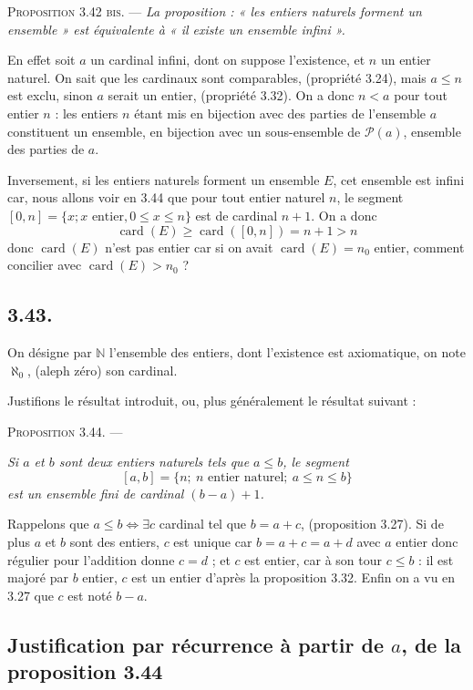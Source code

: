 \medskip\noindent\textsc{Proposition 3.42 bis.} --- \emph{La proposition : « les entiers naturels forment un ensemble » est équivalente à « il existe un ensemble infini ».}

En effet soit $a$ un cardinal infini, dont on suppose l'existence, et $n$ un entier naturel. On sait que les cardinaux sont comparables, (propriété 3.24), mais $a\le n$ est exclu, sinon $a$ serait un entier, (propriété 3.32). On a donc $n<a$ pour tout entier $n$ : les entiers $n$ étant mis en bijection avec des parties de l'ensemble $a$ constituent un ensemble, en bijection avec un sous-ensemble de $\mathcal P(a)$, ensemble des parties de $a$.

Inversement, si les entiers naturels forment un ensemble $E$, cet ensemble est infini car, nous allons voir en 3.44 que pour tout entier naturel $n$, le segment $[0,n]=\{x;x\text{ entier},0\le x\le n\}$ est de cardinal $n+1$. On a donc
\[
\operatorname{card}(E)\ge\operatorname{card}([0,n])=n+1>n
\]
donc $\operatorname{card}(E)$ n'est pas entier car si on avait $\operatorname{card}(E)=n_0$ entier, comment concilier avec $\operatorname{card}(E)>n_0$ ?

\subsection*{3.43.}
On désigne par $\mathbb N$ l'ensemble des entiers, dont l'existence est axiomatique, on note $\aleph_0$, (aleph zéro) son cardinal.

Justifions le résultat introduit, ou, plus généralement le résultat suivant :

\medskip\noindent\textsc{Proposition 3.44.} ---\par\noindent
\emph{Si $a$ et $b$ sont deux entiers naturels tels que $a\le b$, le segment
\[
[a,b]=\{n;\ n\text{ entier naturel};\ a\le n\le b\}
\]
est un ensemble fini de cardinal $(b-a)+1$.}

Rappelons que $a\le b\Leftrightarrow\exists c$ cardinal tel que $b=a+c$, (proposition 3.27). Si de plus $a$ et $b$ sont des entiers, $c$ est unique car $b=a+c=a+d$ avec $a$ entier donc régulier pour l'addition donne $c=d$ ; et $c$ est entier, car à son tour $c\le b$ : il est majoré par $b$ entier, $c$ est un entier d'après la proposition 3.32. Enfin on a vu en 3.27 que $c$ est noté $b-a$.

\subsection*{Justification par récurrence à partir de $a$, de la proposition 3.44}

